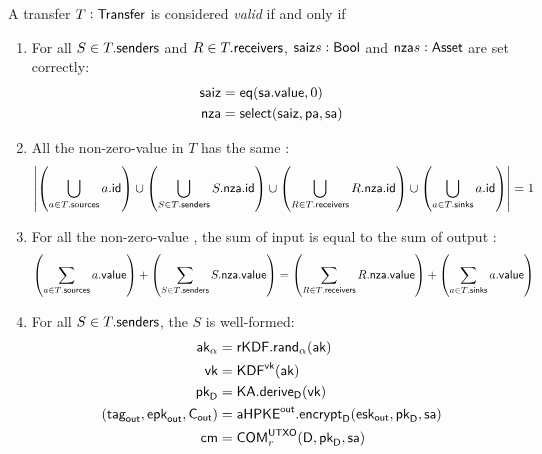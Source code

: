 \begin{definition}\label{def:transfer-validity-statement}
    A transfer $T : {\textsf{Transfer}}$ is considered \emph{valid} if and only if
    \begin{enumerate}
        \item For all $S \in T.{\textsf{senders}}$ and $R \in T.{\textsf{receivers}}$, ${\textsf{saiz}}{s}: {\textsf{Bool}}$ and ${\textsf{nza}}{s}: {\textsf{Asset}}$ are set correctly:
            \begin{align*}
                {\textsf{saiz}} &= {\textsf{eq}}({\textsf{sa}}.{\textsf{value}},0)  \\
                {\textsf{nza}}  &= {\textsf{select}}({\textsf{saiz}}, {\textsf{pa}}, {\textsf{sa}})
            \end{align*}
        \item All the non-zero-value  in $T$ has the same :
            \[
                \left|
                    \left(\bigcup_{a \in T.{\textsf{sources}}} a.{\textsf{id}} \right)
                    \cup
                    \left(\bigcup_{S \in T.{\textsf{senders}}} S.{\textsf{nza}}.{\textsf{id}} \right)
                    \cup
                    \left(\bigcup_{R \in T.{\textsf{receivers}}} R.{\textsf{nza}}.{\textsf{id}} \right)
                    \cup
                    \left(\bigcup_{a \in T.{\textsf{sinks}}} a.{\textsf{id}} \right)
                \right| = 1
            \]
        \item For all the non-zero-value , the sum of input  is equal to the sum of output :
            \[
                \left(\sum_{a \in T.{\textsf{sources}}} a.{\textsf{value}}\right)
                +
                \left(\sum_{S \in T.{\textsf{senders}}} S.{\textsf{nza}}.{\textsf{value}}\right)
                =
                \left(\sum_{R \in T.{\textsf{receivers}}} R.{\textsf{nza}}.{\textsf{value}}\right)
                +
                \left(\sum_{a \in T.{\textsf{sinks}}} a.{\textsf{value}}\right)
            \]
        \item For all $S \in T.{\textsf{senders}}$, the \Sender{} $S$ is well-formed:
            \begin{align*}
                \ak_\alpha                            &= \rKDF.\rand_\alpha(\ak) \\
                \vk                                   &= \KDF^\vk(\ak) \\
                \pkD                                  &= \KA.\derive_\textsf{D}(\vk) \\
                (\tagout, \epkout, \Cout)             &= \aHPKEout.\encrypt_\textsf{D}(\eskout, \pkD, \sa) \\
                \cm                                   &= \COM^{\UTXO}_{r}(\textsf{D}, \pkD, \sa) \\

\end{align*}
\end{enumerate}
\end{definition}
